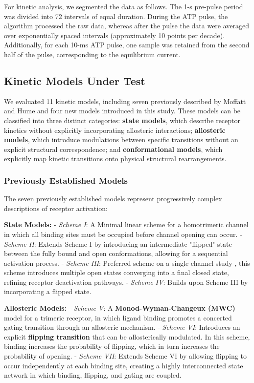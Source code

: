 \documentclass[pdflatex,sn-nature]{sn-jnl}%
\theoremstyle{thmstyleone}%
\theoremstyle{thmstyletwo}%
\theoremstyle{thmstylethree}%
\begin{document}
For kinetic analysis, we segmented the data as follows. The 1-s pre-pulse period was divided into 72 intervals of equal duration. During the ATP pulse, the algorithm processed the raw data, whereas after the pulse the data were averaged over exponentially spaced intervals (approximately 10 points per decade). Additionally, for each 10-ms ATP pulse, one sample was retained from the second half of the pulse, corresponding to the equilibrium current.

\subsection{Kinetic Models Under Test}

We evaluated 11 kinetic models, including seven previously described by Moffatt and Hume \cite{Moffatt_hume} and four new models introduced in this study. These models can be classified  into three distinct categories: \textbf{state models}, which describe receptor kinetics without explicitly incorporating allosteric interactions; \textbf{allosteric models}, which introduce modulations between specific transitions without an explicit structural correspondence; and \textbf{conformational models}, which explicitly map kinetic transitions onto physical structural rearrangements.

\subsubsection{Previously Established Models}

The seven previously established models represent progressively complex descriptions of receptor activation:

\textbf{State Models:}  
- \textit{Scheme I}: A Minimal linear scheme for a homotrimeric channel in which all binding sites must be occupied before channel opening can occur.  
- \textit{Scheme II}: Extends Scheme I by introducing an intermediate "flipped" state between the fully bound and open conformations, allowing for a sequential activation process.  
- \textit{Scheme III}: Preferred scheme on a single channel study \cite{properties_single_channe}, this scheme introduces multiple open states converging into a final closed state, refining receptor deactivation pathways.  
- \textit{Scheme IV}: Builds upon Scheme III by incorporating a flipped state.  

\textbf{Allosteric Models:}  
- \textit{Scheme V}: A \textbf{Monod-Wyman-Changeux (MWC)} model for a trimeric receptor, in which ligand binding promotes a concerted gating transition through an allosteric mechanism.  
- \textit{Scheme VI}: Introduces an explicit \textbf{flipping transition} that can be allosterically modulated. In this scheme, binding increases the probability of flipping, which in turn increases the probability of opening.  
- \textit{Scheme VII}: Extends Scheme VI by allowing flipping to occur independently at each binding site, creating a highly interconnected state network in which binding, flipping, and gating are coupled.  
\end{document}
